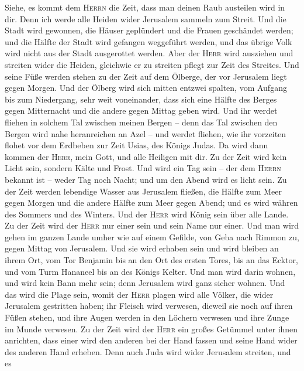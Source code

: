  Siehe, es kommt dem \textsc{Herrn} die Zeit, dass man
deinen Raub austeilen wird in dir.  Denn ich werde alle
Heiden wider Jerusalem sammeln zum Streit. Und die Stadt wird gewonnen,
die Häuser geplündert und die Frauen geschändet werden; und die Hälfte
der Stadt wird gefangen weggeführt werden, und das übrige Volk wird
nicht aus der Stadt ausgerottet werden.  Aber der
\textsc{Herr} wird ausziehen und streiten wider die Heiden, gleichwie er
zu streiten pflegt zur Zeit des Streites.  Und seine Füße
werden stehen zu der Zeit auf dem Ölberge, der vor Jerusalem liegt gegen
Morgen. Und der Ölberg wird sich mitten entzwei spalten, vom Aufgang bis
zum Niedergang, sehr weit voneinander, dass sich eine Hälfte des Berges
gegen Mitternacht und die andere gegen Mittag geben wird. 
Und ihr werdet fliehen in solchem Tal zwischen meinen Bergen -- denn das
Tal zwischen den Bergen wird nahe heranreichen an Azel -- und werdet
fliehen, wie ihr vorzeiten flohet vor dem Erdbeben zur Zeit Usias, des
Königs Judas. Da wird dann kommen der \textsc{Herr}, mein Gott, und alle
Heiligen mit dir.  Zu der Zeit wird kein Licht sein,
sondern Kälte und Frost.  Und wird ein Tag sein -- der dem
\textsc{Herrn} bekannt ist -- weder Tag noch Nacht; und um den Abend
wird es licht sein.  Zu der Zeit werden lebendige Wasser
aus Jerusalem fließen, die Hälfte zum Meer gegen Morgen und die andere
Hälfte zum Meer gegen Abend; und es wird währen des Sommers und des
Winters.  Und der \textsc{Herr} wird König sein über alle
Lande. Zu der Zeit wird der \textsc{Herr} nur einer sein und sein Name
nur einer.  Und man wird gehen im ganzen Lande umher wie
auf einem Gefilde, von Geba nach Rimmon zu, gegen Mittag von Jerusalem.
Und sie wird erhaben sein und wird bleiben an ihrem Ort, vom Tor
Benjamin bis an den Ort des ersten Tores, bis an das Ecktor, und vom
Turm Hananeel bis an des Königs Kelter.  Und man wird
darin wohnen, und wird kein Bann mehr sein; denn Jerusalem wird ganz
sicher wohnen.  Und das wird die Plage sein, womit der
\textsc{Herr} plagen wird alle Völker, die wider Jerusalem gestritten
haben; ihr Fleisch wird verwesen, dieweil sie noch auf ihren Füßen
stehen, und ihre Augen werden in den Löchern verwesen und ihre Zunge im
Munde verwesen.  Zu der Zeit wird der \textsc{Herr} ein
großes Getümmel unter ihnen anrichten, dass einer wird den anderen bei
der Hand fassen und seine Hand wider des anderen Hand erheben.
 Denn auch Juda wird wider Jerusalem streiten, und es
